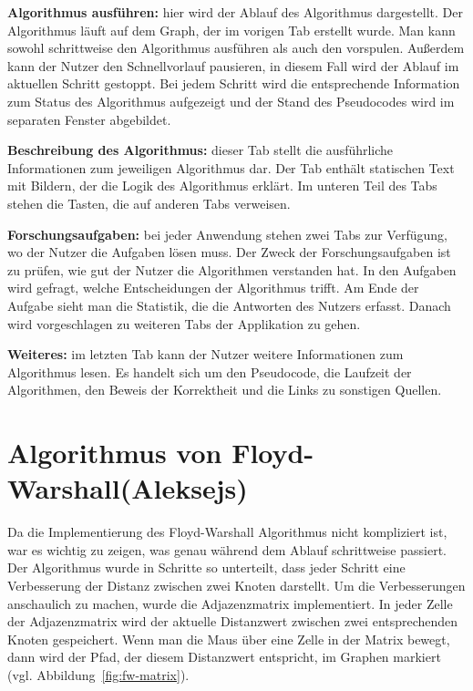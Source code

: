 \noindent\textbf{Algorithmus ausführen:} hier wird der Ablauf des Algorithmus dargestellt. Der Algorithmus läuft auf dem Graph, der im vorigen Tab erstellt wurde. Man kann sowohl schrittweise den Algorithmus ausführen als auch den vorspulen. Außerdem kann der Nutzer den Schnellvorlauf pausieren, in diesem Fall wird der Ablauf im aktuellen Schritt gestoppt. Bei jedem Schritt wird die entsprechende Information zum Status des Algorithmus aufgezeigt und der Stand des Pseudocodes wird im separaten Fenster abgebildet.

\noindent\textbf{Beschreibung des Algorithmus:} dieser Tab stellt die ausführliche Informationen zum jeweiligen Algorithmus dar. Der Tab enthält statischen Text mit Bildern, der die Logik des Algorithmus erklärt. Im unteren Teil des Tabs stehen die Tasten, die auf anderen Tabs verweisen.

\noindent\textbf{Forschungsaufgaben:} bei jeder Anwendung stehen zwei Tabs zur Verfügung, wo der Nutzer die Aufgaben lösen muss. Der Zweck der Forschungsaufgaben ist zu prüfen, wie gut der Nutzer die Algorithmen verstanden hat. In den Aufgaben wird gefragt, welche Entscheidungen der Algorithmus trifft. Am Ende der Aufgabe sieht man die Statistik, die die Antworten des Nutzers erfasst. Danach wird vorgeschlagen zu weiteren Tabs der Applikation zu gehen.

\noindent\textbf{Weiteres:} im letzten Tab kann der Nutzer weitere Informationen zum Algorithmus lesen. Es handelt sich um den Pseudocode, die Laufzeit der Algorithmen, den Beweis der Korrektheit und die Links zu sonstigen Quellen.

\section{Algorithmus von Floyd-Warshall(Aleksejs)}
Da die Implementierung des Floyd-Warshall Algorithmus nicht kompliziert ist, war es wichtig zu zeigen, was genau während dem Ablauf schrittweise passiert. Der Algorithmus wurde in Schritte so unterteilt, dass jeder Schritt eine Verbesserung der Distanz zwischen zwei Knoten darstellt. Um die Verbesserungen anschaulich zu machen, wurde die Adjazenzmatrix implementiert. In jeder Zelle der Adjazenzmatrix wird der aktuelle Distanzwert zwischen zwei entsprechenden Knoten gespeichert. Wenn man die Maus über eine Zelle in der Matrix bewegt, dann wird der Pfad, der diesem Distanzwert entspricht, im Graphen markiert (vgl. Abbildung~\ref{fig:fw-matrix}).

